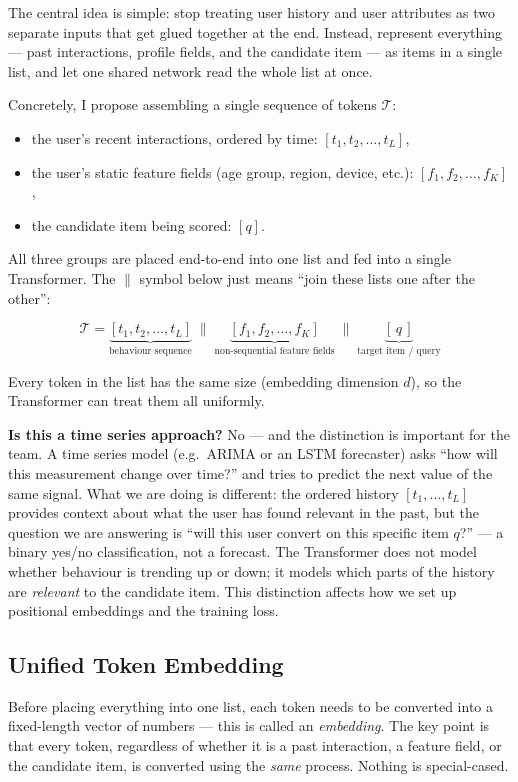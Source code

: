\documentclass[10pt]{article}
\begin{document}
The central idea is simple: stop treating user history and user
attributes as two separate inputs that get glued together at the end.
Instead, represent everything --- past interactions, profile fields, and
the candidate item --- as items in a single list, and let one shared
network read the whole list at once.

Concretely, I propose assembling a single sequence of tokens
$\mathcal{T}$:
\begin{itemize}[noitemsep]
    \item the user's recent interactions, ordered by time:
          $[t_1, t_2, \ldots, t_L]$,
    \item the user's static feature fields (age group, region, device,
          etc.): $[f_1, f_2, \ldots, f_K]$,
    \item the candidate item being scored: $[q]$.
\end{itemize}
All three groups are placed end-to-end into one list and fed into a
single Transformer. The $\|$ symbol below just means
``join these lists one after the other'':

\[
\mathcal{T} = \underbrace{[t_1, t_2, \ldots, t_L]}_{\text{behaviour sequence}}
\;\|\;
\underbrace{[f_1, f_2, \ldots, f_K]}_{\text{non-sequential feature fields}}
\;\|\;
\underbrace{[\,q\,]}_{\text{target item / query}}
\]

Every token in the list has the same size (embedding dimension $d$), so
the Transformer can treat them all uniformly.

\textbf{Is this a time series approach?} No --- and the distinction is
important for the team. A time series model (e.g.\ ARIMA or an LSTM
forecaster) asks ``how will this measurement change over time?'' and
tries to predict the next value of the same signal. What we are doing is
different: the ordered history $[t_1, \ldots, t_L]$ provides context
about what the user has found relevant in the past, but the question we
are answering is ``will this user convert on this specific item $q$?'' ---
a binary yes/no classification, not a forecast. The Transformer does not
model whether behaviour is trending up or down; it models which parts of
the history are \emph{relevant} to the candidate item. This distinction
affects how we set up positional embeddings and the training loss.
\newpage
\subsection{Unified Token Embedding}

Before placing everything into one list, each token needs to be
converted into a fixed-length vector of numbers --- this is called an
\emph{embedding}. The key point is that every token, regardless of
whether it is a past interaction, a feature field, or the candidate
item, is converted using the \emph{same} process. Nothing is
special-cased.
\end{document}
